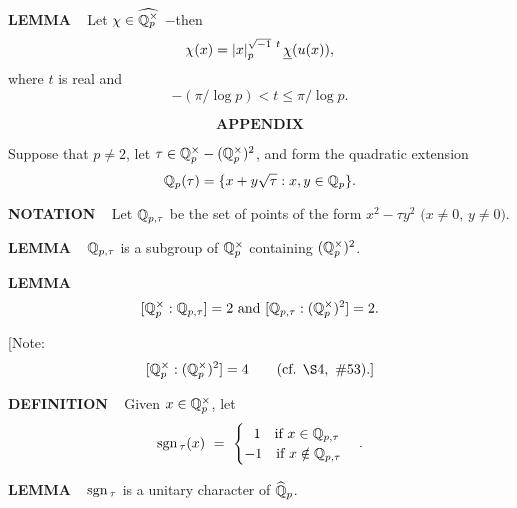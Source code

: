 \vspace{0.2cm}

\begin{x}{\small\bf LEMMA} \ %
Let $\chi \in \widehat{\mathbb{Q}_p^\times}$ $-$then
\[
\chi(x) = \left\vert x\right\vert_p^{\sqrt{-1} \  t} \underline{\chi}(u(x)),
\]
where $t$ is real and 
\[
-(\pi / \log p) < t \le \pi / \log p.
\]
\end{x}

\newpage



\[
\textbf{APPENDIX}
\]
\setcounter{theoremn}{0}



Suppose that $p \ne 2$, let $\tau \in \mathbb{Q}_p^\times - (\mathbb{Q}_p^\times)^2$, and form the quadratic extension
\[
\mathbb{Q}_p(\tau) = \{x+y \sqrt{\tau} : x,y \in \mathbb{Q}_p\}.
\]

\begin{x}{\small\bf NOTATION} \ %
Let $\mathbb{Q}_{p,\tau}$ be the set of points of the form $x^2 - \tau y^2$ $(x \ne 0$, $y \ne 0)$.
\end{x}

\vspace{0.1cm}

\begin{x}{\small\bf LEMMA} \ %
$\mathbb{Q}_{p,\tau}$ is a subgroup of $\mathbb{Q}_p^\times$ containing $(\mathbb{Q}_p^\times)^2$.
\end{x}

\vspace{0.1cm}

\begin{x}{\small\bf LEMMA} \ %
\[
[\mathbb{Q}_p^\times:\mathbb{Q}_{p,\tau}] = 2 \text{ and } [\mathbb{Q}_{p,\tau}:(\mathbb{Q}_p^\times)^2] = 2.
\]

[Note:
\[
[\Q_p^\times:(\Q_p^\times)^2] = 4		\qquad (\text{cf. } \S 4, \ \# 53).]
\]
\end{x}

\vspace{0.1cm}

\begin{x}{\small\bf DEFINITION} \ %
Given $x \in \mathbb{Q}_p^\times$, let
\[
\sgn_\tau(x) \ = \ 
\begin{cases}
\  \ 1	\quad \text{if }x \in \Q_{p,\tau}\\
-1 	\quad \text{if } x \notin \Q_{p,\tau}
\end{cases}
.
\]
\end{x}

\vspace{0.1cm}

\begin{x}{\small\bf LEMMA} \ %
$\text{sgn}\hspace{0.05cm}_\tau$ is a unitary character of $\widehat{\mathbb{Q}}_p$.
\end{x}





















